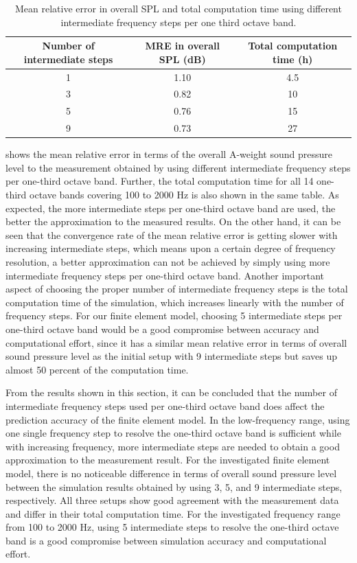 \begin{table}
	\caption{Mean relative error in overall SPL and total computation time using different intermediate frequency steps per one third octave band.}
	\label{tab:freq_steps_MRE}
	\centering
	\begin{tabular}{ccc}
		\toprule
		Number of intermediate steps & MRE in overall SPL (dB) & Total computation time (h) \\ 
		\midrule
		1  & 1.10 & 4.5 \\ 
		3  & 0.82 & 10 \\
		5  & 0.76 & 15 \\
		9  & 0.73 & 27 \\
		\bottomrule
	\end{tabular}
\end{table}

\noindent{} shows the mean relative error in terms of the overall A-weight sound pressure level to the measurement obtained by using different intermediate frequency steps per one-third octave band. Further, the total computation time for all 14 one-third octave bands covering 100 to 2000 Hz is also shown in the same table. As expected, the more intermediate steps per one-third octave band are used, the better the approximation to the measured results. On the other hand, it can be seen that the convergence rate of the mean relative error is getting slower with increasing intermediate steps, which means upon a certain degree of frequency resolution, a better approximation can not be achieved by simply using more intermediate frequency steps per one-third octave band. Another important aspect of choosing the proper number of intermediate frequency steps is the total computation time of the simulation, which increases linearly with the number of frequency steps. For our finite element model, choosing 5 intermediate steps per one-third octave band would be a good compromise between accuracy and computational effort, since it has a similar mean relative error in terms of overall sound pressure level as the initial setup with 9 intermediate steps but saves up almost 50 percent of the computation time.

From the results shown in this section, it can be concluded that the number of intermediate frequency steps used per one-third octave band does affect the prediction accuracy of the finite element model. In the low-frequency range, using one single frequency step to resolve the one-third octave band is sufficient while with increasing frequency, more intermediate steps are needed to obtain a good approximation to the measurement result. For the investigated finite element model, there is no noticeable difference in terms of overall sound pressure level between the simulation results obtained by using 3, 5, and 9 intermediate steps, respectively. All three setups show good agreement with the measurement data and differ in their total computation time. For the investigated frequency range from 100 to 2000 Hz, using 5 intermediate steps to resolve the one-third octave band is a good compromise between simulation accuracy and computational effort. 